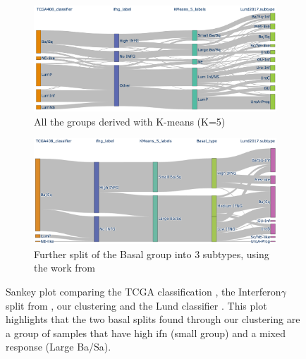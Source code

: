 \begin{figure}[!t]
    \centering
    \begin{subfigure}[!t]{1.0\textwidth}
    \includegraphics[width=1.0\textwidth,keepaspectratio]{Sections/ClusteringAnalysis/Resources/discussion/inf_comp.png}
        \caption{All the groups derived with K-means (K=5)}
        \label{fig:cs:ifn_all}
    \end{subfigure}
    \centering
    \begin{subfigure}[!t]{1.0\textwidth}
        \includegraphics[width=\textwidth,keepaspectratio]{Sections/ClusteringAnalysis/Resources/discussion/inf_3_basal.png}
        \caption{Further split of the Basal group into 3 subtypes, using the work from \citet{Baker2022-bj}}
        \label{fig:cs:ifn_three_basal}
    \end{subfigure} 
    \centering
    \centering
    \caption{Sankey plot comparing the TCGA classification \citet{Robertson2017-mg}, the Interferon$\gamma$ split from \cite{Baker2022-bj}, our clustering and the Lund classifier \citet{Marzouka2018-ge}. This plot highlights that the two basal splits found through our clustering are a group of samples that have high \acrshort{ifn} (small group) and a mixed response (Large Ba/Sa). }
    \label{fig:cs:ifn_comp}
\end{figure}

